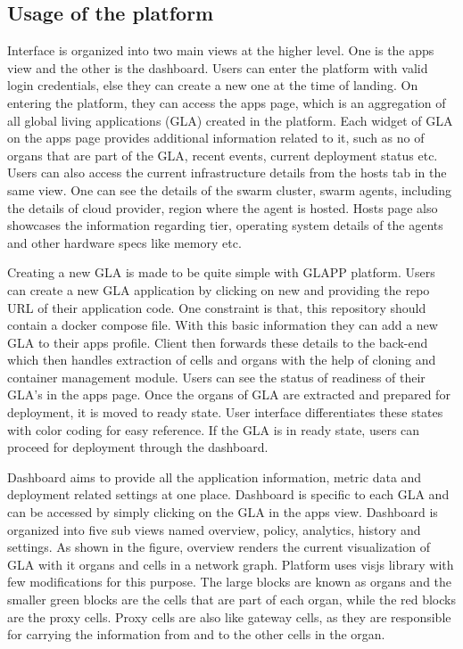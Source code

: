 \documentclass{seal_thesis}
\begin{document}
\subsection{Usage of the platform}

Interface is organized into two main views at the higher level. 
One is the apps view and the other is the dashboard. 
Users can enter the platform with valid login credentials, else they can create a new one at the time of landing. 
On entering the platform, they can access the apps page, which is an aggregation of all global living applications (GLA) created in the platform. 
Each widget of GLA on the apps page provides additional information related to it, such as no of organs that are part of the GLA, recent events, current deployment status etc. 
Users can also access the current infrastructure details from the hosts tab in the same view. 
One can see the details of the swarm cluster, swarm agents, including the details of cloud provider, region where the agent is hosted. 
Hosts page also showcases the information regarding tier, operating system details of the agents and other hardware specs like memory etc.

Creating a new GLA is made to be quite simple with GLAPP platform. 
Users can create a new GLA application by clicking on new and providing the repo URL of their application code. 
One constraint is that, this repository should contain a docker compose file. 
With this basic information they can add a new GLA to their apps profile. 
Client then forwards these details to the back-end which then handles extraction of cells and organs with the help of cloning and container management module. 
Users can see the status of readiness of their GLA's in the apps page. 
Once the organs of GLA are extracted and prepared for deployment, it is moved to ready state. 
User interface differentiates these states with color coding for easy reference. If the GLA is in ready state, users can proceed for deployment through the dashboard.

Dashboard aims to provide all the application information, metric data and deployment related settings at one place. 
Dashboard is specific to each GLA and can be accessed by simply clicking on the GLA in the apps view. 
Dashboard is organized into five sub views named overview, policy, analytics, history and settings. 
As shown in the figure, overview renders the current visualization of GLA with it organs and cells in a network graph. 
Platform uses visjs library with few modifications for this purpose. 
The large blocks are known as organs and the smaller green blocks are the cells that are part of each organ, while the red blocks are the proxy cells. 
Proxy cells are also like gateway cells, as they are responsible for carrying the information from and to the other cells in the organ.
\end{document}
